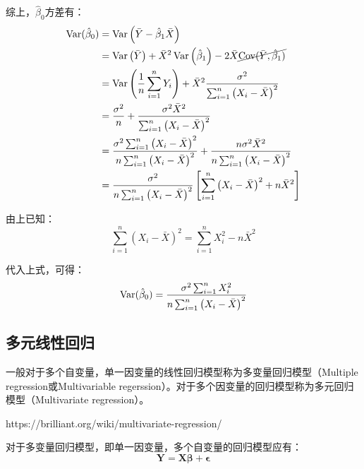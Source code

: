 \documentclass[11pt]{article}
\begin{document}
\begin{property}
    综上，$\hat{\beta}_0$方差有：
    \begin{align*}
        \operatorname{Var}(\hat{\beta}_0) 
        &= \operatorname{Var}\left( \bar{Y} - \hat{\beta}_1 \bar{X} \right) \\
        &= \operatorname{Var} \left(\bar{Y}\right) + \bar{X}^2 \operatorname{Var}\left( \hat{\beta}_1 \right) - 2\bar{X} \cancel{\operatorname{Cov}(\bar{Y},\hat{\beta}_1)} \\
        &= \operatorname{Var}\left( \frac{1}{n} \sum_{i=1}^{n} Y_i \right) + \bar{X}^2 \frac{\sigma^2}{\sum_{i=1}^{n} \left(X_i - \bar{X}\right)^2} \\
        &= \frac{\sigma^2}{n} + \frac{\sigma^2 \bar{X}^2}{\sum_{i=1}^{n} \left(X_i - \bar{X}\right)^2} \\
        &= \frac{\sigma^2 \sum_{i=1}^{n} \left(X_i - \bar{X}\right)^2}{n \sum_{i=1}^{n} \left(X_i - \bar{X}\right)^2}
        + \frac{n \sigma^2 \bar{X}^2}{n \sum_{i=1}^{n} \left(X_i - \bar{X}\right)^2} \\
        &= \frac{\sigma^2}{n \sum_{i=1}^{n} \left(X_i - \bar{X}\right)^2} \left[ \sum_{i=1}^{n} \left(X_i - \bar{X}\right)^2 + n\bar{X}^2 \right]
    \end{align*}

    由上已知：
    \begin{equation*}
        \sum_{i=1}^{n} \left(X_i - \bar{X}\right)^2
        = \sum_{i=1}^{n} X_i^2 - n \bar{X}^2 
    \end{equation*}

    代入上式，可得：
    \begin{equation*}
        \operatorname{Var}(\hat{\beta}_0)
        = \frac{\sigma^2 \sum_{i=1}^{n} X_i^2}{n \sum_{i=1}^{n} \left(X_i - \bar{X}\right)^2}
    \end{equation*}
\end{property}

\subsection{多元线性回归}

一般对于多个自变量，单一因变量的线性回归模型称为多变量回归模型（Multiple regression或Multivariable regerssion）。对于多个因变量的回归模型称为多元回归模型（Multivariate regression）。

https://brilliant.org/wiki/multivariate-regression/


对于多变量回归模型，即单一因变量，多个自变量的回归模型应有：
\begin{equation*}
    \bm{Y = X \beta + \epsilon}
\end{equation*}
\end{document}
